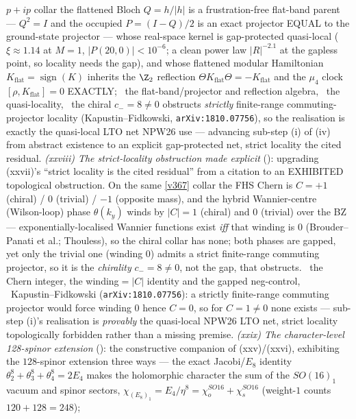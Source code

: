 $p{+}ip$ collar the flattened Bloch $Q{=}h/|h|$ is a frustration-free flat-band parent --- $Q^2{=}I$ and the
occupied $P{=}(I{-}Q)/2$ is an exact projector EQUAL to the ground-state projector --- whose real-space kernel is
gap-protected quasi-local ($\xi{\approx}1.14$ at $M{=}1$, $|P(20,0)|{<}10^{-6}$; a clean power law $|R|^{-2.1}$ at the
gapless point, so locality needs the gap), and whose flattened modular Hamiltonian $K_{\mathrm{flat}}{=}
\operatorname{sign}(K)$ inherits the $\Z_2$ reflection $\Theta K_{\mathrm{flat}}\Theta{=}{-}K_{\mathrm{flat}}$ and the
$\mu_4$ clock $[\rho,K_{\mathrm{flat}}]{=}0$ EXACTLY; \mE\ the flat-band/projector and reflection algebra, \mC\ the
quasi-locality, \mO\ the chiral $c_-{=}8{\neq}0$ obstructs \emph{strictly} finite-range commuting-projector locality
(Kapustin--Fidkowski, \texttt{arXiv:1810.07756}), so the realisation is exactly the quasi-local LTO net NPW26 use ---
advancing sub-step (i) of (iv) from abstract existence to an explicit gap-protected net, strict locality the cited
residual. \emph{(xxviii) The strict-locality obstruction made explicit} ():
upgrading (xxvii)'s ``strict locality is the cited residual'' from a citation to an EXHIBITED topological
obstruction. On the same \vref{v367} collar the FHS Chern is $C{=}{+}1$ (chiral) / $0$ (trivial) / $-1$
(opposite mass), and the hybrid Wannier-centre (Wilson-loop) phase $\theta(k_y)$ winds by $|C|{=}1$ (chiral) and
$0$ (trivial) over the BZ --- exponentially-localised Wannier functions exist \emph{iff} that winding is $0$
(Brouder--Panati et al.; Thouless), so the chiral collar has none; both phases are gapped, yet only the trivial one
(winding $0$) admits a strict finite-range commuting projector, so it is the \emph{chirality} $c_-{=}8{\neq}0$, not
the gap, that obstructs. \mE\ the Chern integer, the winding$={}|C|$ identity and the gapped neg-control, \mC\mO\
Kapustin--Fidkowski (\texttt{arXiv:1810.07756}): a strictly finite-range commuting projector would force winding
$0$ hence $C{=}0$, so for $C{=}1{\neq}0$ none exists --- sub-step (i)'s realisation is \emph{provably} the
quasi-local NPW26 LTO net, strict locality topologically forbidden rather than a missing premise. \emph{(xxix) The
character-level 128-spinor extension} (\veri{v462\_seam\_spinor\_continuum.py}): the constructive companion of
(xxv)/(xxvi), exhibiting the $128$-spinor extension three ways --- the exact Jacobi/$E_8$ identity
$\theta_2^8{+}\theta_3^8{+}\theta_4^8{=}2E_4$ makes the holomorphic character the sum of the $SO(16)_1$ vacuum and
spinor sectors, $\chi_{(E_8)_1}{=}E_4/\eta^8{=}\chi_o^{SO16}{+}\chi_s^{SO16}$ (weight-$1$ counts $120{+}128{=}248$);
